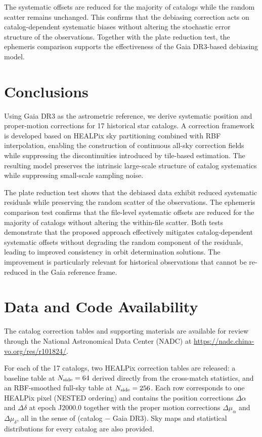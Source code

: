\documentclass[linenumbers,amsmath,manuscript]{aastex702}
\begin{document}
The systematic offsets are reduced for the majority of catalogs while the random scatter remains unchanged. This confirms that the debiasing correction acts on catalog-dependent systematic biases without altering the stochastic error structure of the observations. Together with the plate reduction test, the ephemeris comparison supports the effectiveness of the Gaia DR3-based debiasing model.

\section{Conclusions} \label{sec:conclusions}

Using Gaia DR3 as the astrometric reference, we derive systematic position and proper-motion corrections for 17 historical star catalogs. A correction framework is developed based on HEALPix sky partitioning combined with RBF interpolation, enabling the construction of continuous all-sky correction fields while suppressing the discontinuities introduced by tile-based estimation. The resulting model preserves the intrinsic large-scale structure of catalog systematics while suppressing small-scale sampling noise.

The plate reduction test shows that the debiased data exhibit reduced systematic residuals while preserving the random scatter of the observations. The ephemeris comparison test confirms that the file-level systematic offsets are reduced for the majority of catalogs without altering the within-file scatter. Both tests demonstrate that the proposed approach effectively mitigates catalog-dependent systematic offsets without degrading the random component of the residuals, leading to improved consistency in orbit determination solutions. The improvement is particularly relevant for historical observations that cannot be re-reduced in the Gaia reference frame.

\section{Data and Code Availability} \label{sec:data}

The catalog correction tables and supporting materials are available for review through the National Astronomical Data Center (NADC) at \url{https://nadc.china-vo.org/res/r101824/}. 

For each of the 17 catalogs, two HEALPix correction tables are released: a baseline table at $N_{\rm side}=64$ derived directly from the cross-match statistics, and an RBF-smoothed full-sky table at $N_{\rm side}=256$. Each row corresponds to one HEALPix pixel (NESTED ordering) and contains the position corrections $\Delta\alpha$ and $\Delta\delta$ at epoch J2000.0 together with the proper motion corrections $\Delta\mu_\alpha$ and $\Delta\mu_\delta$, all in the sense of (catalog $-$ Gaia DR3). Sky maps and statistical distributions for every catalog are also provided.
\end{document}
